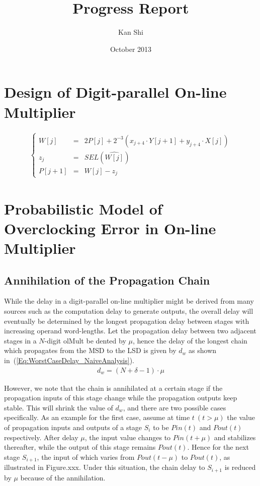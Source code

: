 \documentclass[a4paper, 11pt]{article}
\title{Progress Report}
\author{Kan Shi}
\date{October 2013}
\begin{document}
\maketitle
\vspace{-10mm}

\section{Design of Digit-parallel On-line Multiplier}
\begin{eqnarray}\label{Eq:OnlineMult}
  \left\{\begin{matrix}
    W[j] & = & 2P[j]+2^{-3}(x_{j+4}\cdot Y[j+1]+y_{j+4}\cdot X[j])\\
    z_j  & = & SEL(\widehat{W[j]})\\
    P[j+1] & = & W[j]-z_j
  \end{matrix}\right.
\end{eqnarray}

\section{Probabilistic Model of Overclocking Error in On-line Multiplier}
\subsection{Annihilation of the Propagation Chain}\label{subSec:AnnihilationOfChain}

While the delay in a digit-parallel on-line multiplier might be derived from many sources such as the computation delay to generate outputs, the overall delay will eventually be determined by the longest propagation delay between stages with increasing operand word-lengths. Let the propagation delay between two adjacent stages in a $N$-digit olMult be dented by $\mu$, hence the delay of the longest chain which propagates from the MSD to the LSD is given by $d_w$ as shown in~(\ref{Eq:WorstCaseDelay_NaiveAnalysis}).
\begin{eqnarray}\label{Eq:WorstCaseDelay_NaiveAnalysis}
  d_w = (N+\delta-1)\cdot \mu
\end{eqnarray}

However, we note that the chain is annihilated at a certain stage if the propagation inputs of this stage change while the propagation outputs keep stable. This will shrink the value of $d_w$, and there are two possible cases specifically. As an example for the first case, assume at time $t~(t>\mu)$ the value of propagation inputs and outputs of a stage $S_i$ to be $Pin(t)$ and $Pout(t)$ respectively. After delay $\mu$, the input value changes to $Pin(t+\mu)$ and stabilizes thereafter, while the output of this stage remains $Pout(t)$. Hence for the next stage $S_{i+1}$, the input of which varies from $Pout(t-\mu)$ to $Pout(t)$, as illustrated in Figure.xxx. Under this situation, the chain delay to $S_{i+1}$ is reduced by $\mu$ because of the annihilation. 
\end{document}
